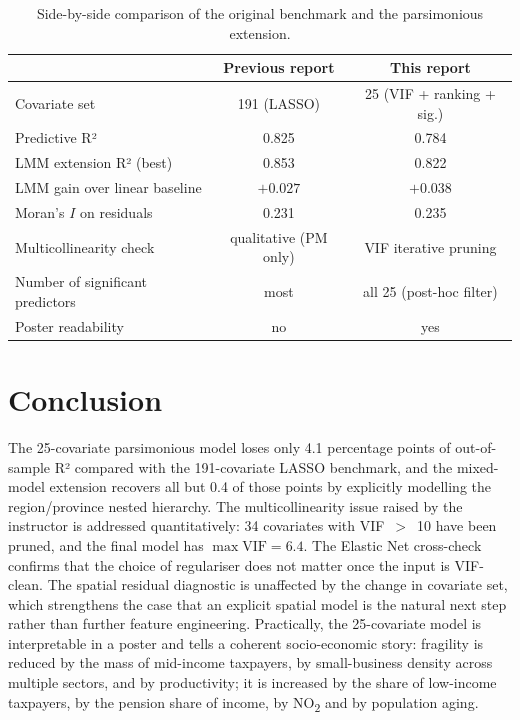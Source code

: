 \documentclass[11pt,a4paper]{article}
\begin{document}
\begin{table}[h!]
  \centering
  \begin{tabular}{lcc}
    \toprule
    & Previous report & This report \\
    \midrule
    Covariate set                          & 191 (LASSO)           & 25 (VIF + ranking + sig.) \\
    Predictive R²                          & 0.825                 & 0.784 \\
    LMM extension R² (best)                & 0.853                 & 0.822 \\
    LMM gain over linear baseline          & $+0.027$              & $+0.038$ \\
    Moran's $I$ on residuals               & 0.231                 & 0.235 \\
    Multicollinearity check                & qualitative (PM only) & VIF iterative pruning \\
    Number of significant predictors       & most                  & all 25 (post-hoc filter) \\
    Poster readability                     & no                    & yes \\
    \bottomrule
  \end{tabular}
  \caption{Side-by-side comparison of the original benchmark and the
    parsimonious extension.}
\end{table}

\section{Conclusion}

The 25-covariate parsimonious model loses only 4.1 percentage points
of out-of-sample R² compared with the 191-covariate LASSO benchmark,
and the mixed-model extension recovers all but 0.4 of those points by
explicitly modelling the region/province nested hierarchy. The
multicollinearity issue raised by the instructor is addressed
quantitatively: 34 covariates with VIF~$>$~10 have been pruned, and
the final model has $\max\mathrm{VIF} = 6.4$. The Elastic Net
cross-check confirms that the choice of regulariser does not matter
once the input is VIF-clean. The spatial residual diagnostic is
unaffected by the change in covariate set, which strengthens the
case that an explicit spatial model is the natural next step rather
than further feature engineering. Practically, the 25-covariate model
is interpretable in a poster and tells a coherent socio-economic
story: fragility is reduced by the mass of mid-income taxpayers, by
small-business density across multiple sectors, and by productivity;
it is increased by the share of low-income taxpayers, by the
pension share of income, by NO\textsubscript{2} and by population
aging.
\end{document}

